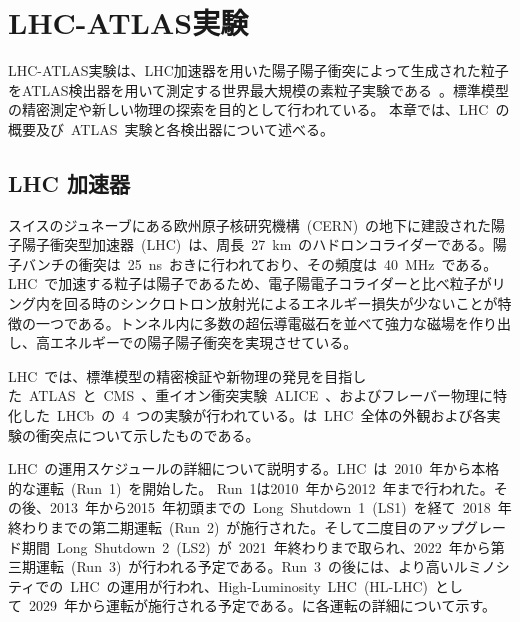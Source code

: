 \chapter{LHC-ATLAS実験}
\thispagestyle{empty}
\label{chap:2}
LHC-ATLAS実験は、LHC加速器を用いた陽子陽子衝突によって生成された粒子をATLAS検出器を用いて測定する世界最大規模の素粒子実験である~\cite{TR:01}。標準模型の精密測定や新しい物理の探索を目的として行われている。
本章では、LHC~の概要及び~ATLAS~実験と各検出器について述べる。

\section{LHC 加速器}
スイスのジュネーブにある欧州原子核研究機構~(CERN)~の地下に建設された陽子陽子衝突型加速器~(LHC)~は、周長~27~km~のハドロンコライダーである。陽子バンチの衝突は~25~ns~おきに行われており、その頻度は~40~MHz~である。LHC~で加速する粒子は陽子であるため、電子陽電子コライダーと比べ粒子がリング内を回る時のシンクロトロン放射光によるエネルギー損失が少ないことが特徴の一つである。トンネル内に多数の超伝導電磁石を並べて強力な磁場を作り出し、高エネルギーでの陽子陽子衝突を実現させている。

LHC~では、標準模型の精密検証や新物理の発見を目指した~ATLAS~\cite{URL:13}と~CMS~\cite{URL:14}、重イオン衝突実験~ALICE~\cite{URL:15}、およびフレーバー物理に特化した~LHCb~\cite{URL:16}の~4~つの実験が行われている。は~LHC~全体の外観および各実験の衝突点について示したものである。

LHC~の運用スケジュールの詳細について説明する。LHC~は~2010~年から本格的な運転~(Run~1)~を開始した。
Run~1は2010~年から2012~年まで行われた。その後、2013~年から2015~年初頭までの~Long~Shutdown~1~(LS1)~を経て~2018~年終わりまでの第二期運転~(Run~2)~が施行された。そして二度目のアップグレード期間~Long~Shutdown~2~(LS2)~が~2021~年終わりまで取られ、2022~年から第三期運転~(Run~3)~が行われる予定である。Run~3~の後には、より高いルミノシティでの~LHC~の運用が行われ、High-Luminosity~LHC~(HL-LHC)~として~2029~年から運転が施行される予定である。に各運転の詳細について示す。

